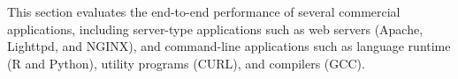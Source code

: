 \label{sec:eval:apps}

\makeatletter
{}
\makeatother
\graphicspath{{eval/apps/figures/}}

This section evaluates the end-to-end performance of several commercial applications,
including server-type applications such as web servers (Apache, Lighttpd, and NGINX),
and command-line applications such as language runtime (R and Python), utility programs (CURL),
and compilers (GCC).


